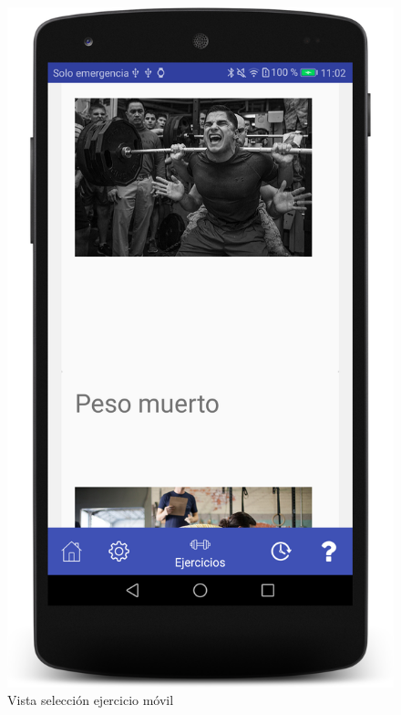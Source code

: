 \begin{figure}[H]
	\centering
	\includegraphics[scale=0.10]{imagenes/m4.png}
	\caption{Vista selección ejercicio móvil}
	\label{Vista selección ejercicio movil}
\end{figure}

